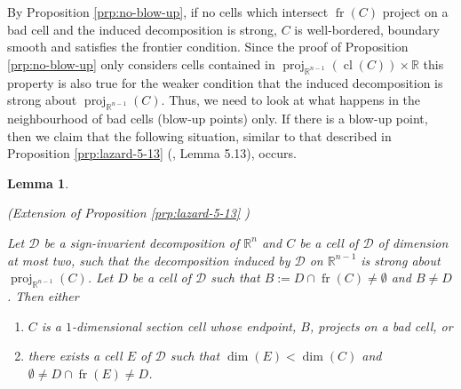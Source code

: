 \documentclass[
]{book}
\newtheorem{lemma}{Lemma}[chapter]
\theoremstyle{definition}
\theoremstyle{definition}
\theoremstyle{definition}
\theoremstyle{definition}
\theoremstyle{remark}
\begin{document}
By Proposition \ref{prp:no-blow-up}, if no cells which intersect \({\operatorname{fr} \left( C \right)}\) project on a bad cell and the induced decomposition is strong, \(C\) is well-bordered, boundary smooth and satisfies the frontier condition. Since the proof of Proposition \ref{prp:no-blow-up} only considers cells contained in \({\operatorname{proj}_{\mathbb{R}^{n-1}}}({\operatorname{cl} \left( C \right)}) \times \mathbb{R}\) this property is also true for the weaker condition that the induced decomposition is strong about \({\operatorname{proj}_{\mathbb{R}^{n-1}}}(C)\).
Thus, we need to look at what happens in the neighbourhood of bad cells (blow-up points) only.
If there is a blow-up point, then we claim that the following situation, similar to that described in Proposition \ref{prp:lazard-5-13} (\citet{lazard10}, Lemma 5.13), occurs.

\begin{lemma}
\protect\hypertarget{lem:ext-lazard-5-13}{}\label{lem:ext-lazard-5-13}

(Extension of Proposition \ref{prp:lazard-5-13} \citep[Proposition 5.13]{lazard10})

Let \(\mathcal{D}\) be a sign-invarient decomposition of \(\mathbb{R}^n\) and \(C\) be a cell of \(\mathcal{D}\) of dimension at most two, such that the decomposition induced by \(\mathcal{D}\) on \(\mathbb{R}^{n-1}\) is strong about \({\operatorname{proj}_{\mathbb{R}^{n-1}}}(C)\). Let \(D\) be a cell of \(\mathcal{D}\) such that \(B := D \cap {\operatorname{fr} \left(  C  \right)} \neq \emptyset\) and \(B \neq D\). Then either

\begin{enumerate}
\def\labelenumi{\arabic{enumi}.}
\item
  \(C\) is a \(1\)-dimensional section cell whose endpoint, \(B\), projects on a bad cell, or
\item
  there exists a cell \(E\) of \(\mathcal{D}\) such that \(\dim(E) < \dim(C)\) and \(\emptyset \neq D \cap {\operatorname{fr} \left(  E  \right)} \neq D\).
\end{enumerate}

\end{lemma}
\end{document}
